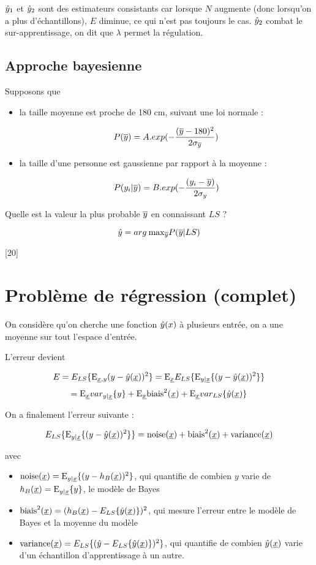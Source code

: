 	$\hat{y}_1$ et $\hat{y}_2$ sont des estimateurs consistants car lorsque $N$ augmente (donc lorsqu'on a plus d'échantillons), $E$ diminue, ce qui n'est pas toujours le cas. $\hat{y}_2$ combat le sur-apprentissage, on dit que $\lambda$ permet la régulation.
	
	
		\subsection{Approche bayesienne}
		
		Supposons que
		
		\begin{itemize}
			\item la taille moyenne est proche de 180 cm, suivant une loi normale :
			
			$$P(\overline{y}) = A.exp(- \frac{(\overline{y} - 180)^2}{2 \sigma_{\overline{y}}})$$
			
			\item la taille d'une personne est gaussienne par rapport à la moyenne :
			
			$$P(y_i \vert \overline{y} ) = B.exp(- \frac{(y_i - \overline{y})}{2 \sigma_y})$$
		\end{itemize}
		
		Quelle est la valeur la plus probable $\overline{y}$ en connaissant $LS$ ?
		
		$$\hat{y} = arg \: \text{max}_{\overline{y}} P(\overline{y} \vert LS)$$
		
		[20]
	
	\section{Problème de régression (complet)}
	
	On considère qu'on cherche une fonction $\hat{y}(x)$ à plusieurs entrée, on a une moyenne sur tout l'espace d'entrée.
	
	L'erreur devient
	
	$$E = E_{LS}\{\text{E}_{\underline{x}, y}{(y - \hat{y}(\underline{x}))^2}\} = \text{E}_{\underline{x}}{E_{LS}\{\text{E}_{y \vert \underline{x}} \lbrace (y - \hat{y}(\underline{x}))^2 \rbrace\}}$$
	$$= \text{E}_{\underline{x}}{var_{y\vert \underline{x}}\{y\}} + \text{E}_{\underline{x}}{\text{biais}^2(\underline{x})} + \text{E}_{\underline{x}}{var_{LS}\{\hat{y}(\underline{x})\}}$$
	
	On a finalement l'erreur suivante :
	
	$$E_{LS}\{\text{E}_{y \vert \underline{x}} \lbrace (y - \hat{y}(\underline{x}))^2 \rbrace\} = \text{noise}(\underline{x}) + \text{biais}^2(\underline{x}) + \text{variance}(\underline{x})$$
	
	avec
	
	\begin{itemize}
		\item $\text{noise}(\underline{x}) = \text{E}_{y \vert \underline{x}} \lbrace (y - h_B(\underline{x}))^2 \rbrace$, qui quantifie de combien $y$ varie de $h_B(\underline{x}) = \text{E}_{y \vert \underline{x}} \lbrace y \rbrace$, le modèle de Bayes
		\item $\text{biais}^2(\underline{x}) = (h_B(\underline{x}) - E_{LS}\{\hat{y}(\underline{x})\})^2$, qui mesure l'erreur entre le modèle de Bayes et la moyenne du modèle
		\item $\text{variance}(\underline{x}) = E_{LS}\{(\hat{y} - E_{LS}\{\hat{y}(\underline{x})\})^2\}$, qui quantifie de combien $\hat{y}(\underline{x})$ varie d'un échantillon d'apprentissage à un autre.
	\end{itemize}
	
